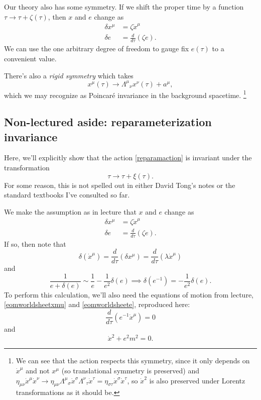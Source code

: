 \begin{exm}
    Our theory also has some symmetry. If we shift the proper time by a function $\tau\to \tau+\zeta(\tau)$, then $x$ and $e$ change as 
    \begin{align*}
        \delta x^\mu &= \zeta \dot x^\mu\\
        \delta e &= \frac{d}{d\tau}(\zeta e).
    \end{align*}
    We can use the one arbitrary degree of freedom to gauge fix $e(\tau)$ to a convenient value.
    
    There's also a \emph{rigid symmetry} which takes
    \begin{equation*}
        x^\mu(\tau)\to \Lambda^\mu{}_\nu x^\nu(\tau)+a^\mu,
    \end{equation*}
    which we may recognize as Poincar\'e invariance in the background spacetime.%
        \footnote{We can see that the action respects this symmetry, since it only depends on $\dot x^\mu$ and not $x^\mu$ (so translational symmetry is preserved) and $\eta_{\mu\nu}\dot x^\mu \dot x^\nu\to \eta_{\mu\nu}\Lambda^\mu{}_\sigma \dot x^\sigma \Lambda^\nu{}_\tau \dot x^\tau = \eta_{\sigma\tau} \dot x^\sigma \dot x^\tau$, so $\dot x^2$ is also preserved under Lorentz transformations as it should be.}
\end{exm}

\subsection*{Non-lectured aside: reparameterization invariance}
Here, we'll explicitly show that the action \ref{reparamaction} is invariant under the transformation
\begin{equation}
    \tau\to \tau+\xi(\tau).
\end{equation}
For some reason, this is not spelled out in either David Tong's notes or the standard textbooks I've consulted so far.

We make the assumption as in lecture that $x$ and $e$ change as 
\begin{align*}
    \delta x^\mu &= \zeta \dot x^\mu\\
    \delta e &= \frac{d}{d\tau}(\zeta e).
\end{align*}
If so, then note that
\begin{equation}
    \delta(\dot x^\mu)=\frac{d}{d\tau}(\delta x^\mu)=\frac{d}{d\tau}(\lambda \dot x^\mu)
\end{equation}
and
\begin{equation}
    \frac{1}{e+\delta (e)}\sim \frac{1}{e}-\frac{1}{e^2}\delta(e) \implies \delta(e^{-1})=-\frac{1}{e^2}\delta(e).
\end{equation}
To perform this calculation, we'll also need the equations of motion from lecture, \ref{eomworldsheetxmu} and \ref{eomworldsheete}, reproduced here:
\begin{equation*}
    \frac{d}{d\tau}(e^{-1}\dot x^\mu)=0
\end{equation*}
and
\begin{equation*}
    \dot x^2 + e^2m^2=0.
\end{equation*}

